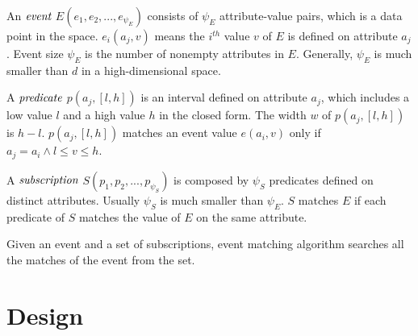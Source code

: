 \documentclass[runningheads]{llncs}
\begin{document}
\begin{definition}
An $\emph{event}$ $ E(e_1, e_2,..., e_{\psi_E})$ consists of $\psi_E$ attribute-value pairs, which is a data point in the space. $e_i(a_j,v)$ means the $i^{th}$ value $v$ of $E$ is defined on attribute $a_j$. Event size $\psi_E$ is the number of nonempty attributes in $E$. Generally, $\psi_E$ is much smaller than $d$ in a high-dimensional space.
\end{definition}
\begin{definition}
A $\emph{predicate}$ $p(a_j, [l,h])$ is an interval defined on attribute $a_j$, which includes a low value $l$ and a high value $h$ in the closed form. The width $w$ of $p(a_j,[l,h])$ is $h - l$. $p(a_j, [l,h])$ matches an event value $e(a_i,v)$ only if $a_j=a_i \land l \le v \le h$.
\end{definition}
\begin{definition}
A $\emph{subscription}$ $S(p_1,p_2,...,p_{\psi_S})$ is composed by $\psi_S$ predicates defined on distinct attributes. Usually $\psi_S$ is much smaller than $\psi_E$. $S$ matches $E$ if each predicate of $S$ matches the value of $E$ on the same attribute. 
\end{definition}
\begin{definition}Given an event and a set of subscriptions, event matching algorithm searches all the matches of the event from the set.
\end{definition}


\section{Design}
\end{document}
